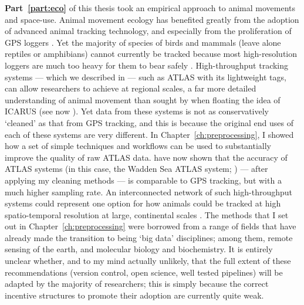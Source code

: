\textbf{Part~\ref{part:eco}} of this thesis took an empirical approach to animal movements and space-use.
Animal movement ecology has benefited greatly from the adoption of advanced animal tracking technology, and especially from the proliferation of GPS loggers \citep{cagnacci2010}.
Yet the majority of species of birds and mammals (leave alone reptiles or amphibians) cannot currently be tracked because most high-resolution loggers are much too heavy for them to bear safely \parencite{kays2015}.
High-throughput tracking systems --- which we described in \textcite{nathan2022} --- such as ATLAS with its lightweight tags, can allow researchers to achieve at regional scales, a far more detailed understanding of animal movement than sought by \textcite{wikelski2007} when floating the idea of ICARUS (see now \cite{jetz2022}).
Yet data from these systems is not as conservatively `cleaned' as that from GPS tracking, and this is because the original end uses of each of these systems are very different.
In Chapter~\ref{ch:preprocessing}, I showed how a set of simple techniques and workflows can be used to substantially improve the quality of raw ATLAS data.
\textcite[]{beardsworth2022mee} have now shown that the accuracy of ATLAS systems (in this case, the Wadden Sea ATLAS system; \cite{bijleveld2021}) --- after applying my cleaning methods --- is comparable to GPS tracking, but with a much higher sampling rate.
An interconnected network of such high-throughput systems could represent one option for how animals could be tracked at high spatio-temporal resolution at large, continental scales \citep{nathan2022}.
The methods that I set out in Chapter~\ref{ch:preprocessing} were borrowed from a range of fields that have already made the transition to being `big data' disciplines; among them, remote sensing of the earth, and molecular biology and biochemistry.
It is entirely unclear whether, and to my mind actually unlikely, that the full extent of these recommendations (version control, open science, well tested pipelines) will be adapted by the majority of researchers; this is simply because the correct incentive structures to promote their adoption are currently quite weak.

